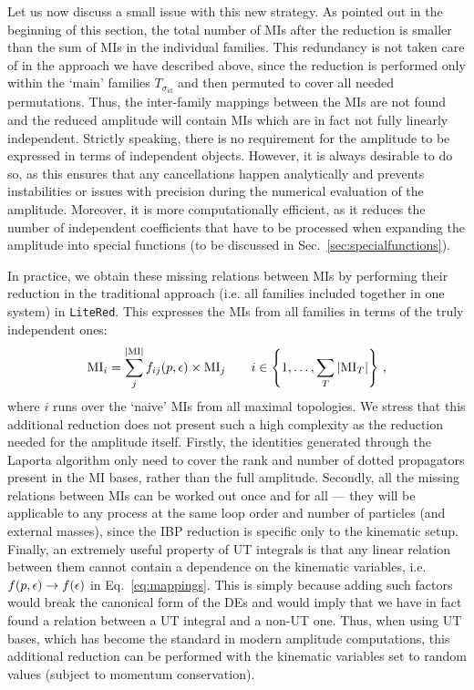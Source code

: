 \documentclass[main.tex]{subfiles}
\begin{document}
Let us now discuss a small issue with this new strategy. As pointed out in the beginning of this section, the total number of MIs after the reduction is smaller than the sum of MIs in the individual families. This redundancy is not taken care of in the approach we have described above, since the reduction is performed only within the ‘main’ families $T_{\sigma_\text{id}}$ and then permuted to cover all needed permutations. Thus, the inter-family mappings between the MIs are not found and the reduced amplitude will contain MIs which are in fact not fully linearly independent. Strictly speaking, there is no requirement for the amplitude to be expressed in terms of independent objects. However, it is always desirable to do so, as this ensures that any cancellations happen analytically and prevents instabilities or issues with precision during the numerical evaluation of the amplitude. Moreover, it is more computationally efficient, as it reduces the number of independent coefficients that have to be processed when expanding the amplitude into special functions (to be discussed in Sec.~\ref{sec:specialfunctions}).

In practice, we obtain these missing relations between MIs by performing their reduction in the traditional approach (i.e. all families included together in one system) in \texttt{LiteRed}. This expresses the MIs from all families in terms of the truly independent ones:
\begin{equation} \label{eq:mappings}
    \text{MI}_{i} = \sum_j^{|\text{MI}|} f_{ij}(p, \epsilon) \times \text{MI}_j \qquad i \in \left\{1, \ldots, \sum_T |\text{MI}_T|\right\}\,,
\end{equation}
where $i$ runs over the `naive' MIs from all maximal topologies. We stress that this additional reduction does not present such a high complexity as the reduction needed for the amplitude itself. Firstly, the identities generated through the Laporta algorithm only need to cover the rank and number of dotted propagators present in the MI bases, rather than the full amplitude. Secondly, all the missing relations between MIs can be worked out once and for all --- they will be applicable to any process at the same loop order and number of particles (and external masses), since the IBP reduction is specific only to the kinematic setup. Finally, an extremely useful property of UT integrals is that any linear relation between them cannot contain a dependence on the kinematic variables, i.e. $f(p, \epsilon) \rightarrow f(\epsilon)$ in Eq.~\ref{eq:mappings}. This is simply because adding such factors would break the canonical form of the DEs and would imply that we have in fact found a relation between a UT integral and a non-UT one. Thus, when using UT bases, which has become the standard in modern amplitude computations, this additional reduction can be performed with the kinematic variables set to random values (subject to momentum conservation). 
\end{document}
